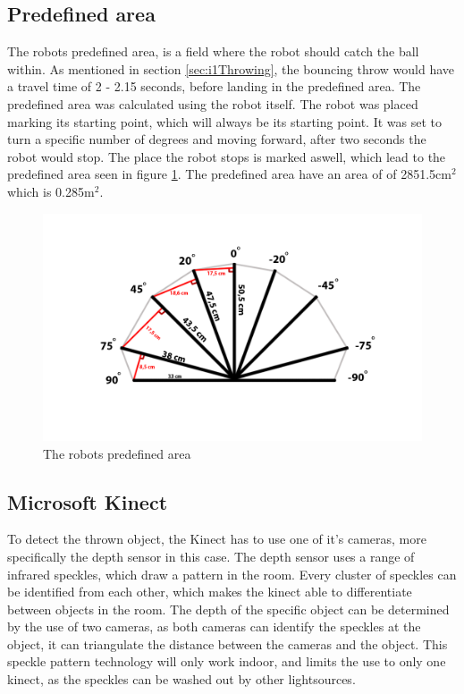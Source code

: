 \subsection{Predefined area}
\label{sec:i1Predefined area}
The robots predefined area, is a field where the robot should catch the ball within. As mentioned in  section \ref{sec:i1Throwing}, the bouncing throw would have a travel time of 2 - 2.15 seconds, before landing in the predefined area. The predefined area was calculated using the robot itself. The robot was placed marking its starting point, which will always be its starting point. It was set to turn a specific number of degrees and moving forward, after two seconds the robot would stop. The place the robot stops is marked aswell, which lead to the predefined area seen in figure \ref{figure:Predefined area}. The predefined area have an area of of 2851.5cm\begin{math}^2\end{math} which is 0.285m\begin{math}^2\end{math}.

\begin{figure}[h]
\centering
\includegraphics[scale=0.35]{billeder/predefined-area}
\caption{The robots predefined area}
\label{figure:Predefined area}
\end{figure}

\subsection{Microsoft Kinect}
\label{sec:i1Microsoft Kinect}
To detect the thrown object, the Kinect has to use one of it's cameras, more specifically the depth sensor in this case. The depth sensor uses a range of infrared speckles, which draw a pattern in the room. Every cluster of speckles can be identified from each other, which makes the kinect able to differentiate between objects in the room. The depth of the specific object can be determined by the use of two cameras, as both cameras can identify the speckles at the object, it can triangulate the distance between the cameras and the object. This speckle pattern technology will only work indoor, and limits the use to only one kinect, as the speckles can be washed out by other lightsources.
\citep{kw}

